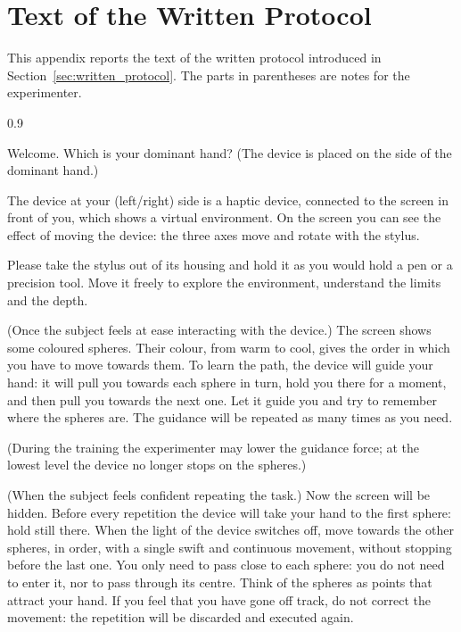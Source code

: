 \documentclass[12pt]{report}
\newenvironment{protocol}
{%
  \begin{minipage}{\textwidth}
  \begin{list}{}{%
    \setlength{\leftmargin}{0cm}%
    \setlength{\rightmargin}{0.8cm}%
    \setlength{\listparindent}{0pt}%
    \setlength{\itemindent}{0pt}%
  }
  \item\relax
  \begin{spacing}{0.9}
  \ttfamily\small
  \ignorespaces
}
{%
  \end{spacing}
  \end{list}
  \end{minipage}
}
\begin{document}
\chapter{Text of the Written Protocol}
\label{app:protocol}
This appendix reports the text of the written protocol introduced in Section~\ref{sec:written_protocol}. The parts in parentheses are notes for the experimenter.

\medskip

\begin{protocol}
Welcome. Which is your dominant hand? (The device is placed on the side of the dominant hand.)

The device at your (left/right) side is a haptic device, connected to the screen in front of you, which shows a virtual environment. On the screen you can see the effect of moving the device: the three axes move and rotate with the stylus.

Please take the stylus out of its housing and hold it as you would hold a pen or a precision tool. Move it freely to explore the environment, understand the limits and the depth.

(Once the subject feels at ease interacting with the device.) The screen shows some coloured spheres. Their colour, from warm to cool, gives the order in which you have to move towards them. To learn the path, the device will guide your hand: it will pull you towards each sphere in turn, hold you there for a moment, and then pull you towards the next one. Let it guide you and try to remember where the spheres are. The guidance will be repeated as many times as you need.

(During the training the experimenter may lower the guidance force; at the lowest level the device no longer stops on the spheres.)

(When the subject feels confident repeating the task.) Now the screen will be hidden. Before every repetition the device will take your hand to the first sphere: hold still there. When the light of the device switches off, move towards the other spheres, in order, with a single swift and continuous movement, without stopping before the last one. You only need to pass close to each sphere: you do not need to enter it, nor to pass through its centre. Think of the spheres as points that attract your hand. If you feel that you have gone off track, do not correct the movement: the repetition will be discarded and executed again.
\end{protocol}

\printnoidxglossary[type=symbols, style=symboltable, sort=def, title={List of Symbols}]

\end{document}
